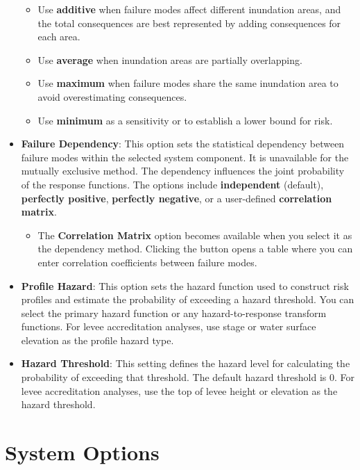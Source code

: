 \documentclass[
]{book}
\providecommand{\tightlist}{%
  \setlength{\itemsep}{0pt}\setlength{\parskip}{0pt}}
\begin{document}
\begin{itemize}
  \begin{itemize}
  \item
    Use \textbf{additive} when failure modes affect different inundation areas, and the total consequences are best represented by adding consequences for each area.
  \item
    Use \textbf{average} when inundation areas are partially overlapping.
  \item
    Use \textbf{maximum} when failure modes share the same inundation area to avoid overestimating consequences.
  \item
    Use \textbf{minimum} as a sensitivity or to establish a lower bound for risk.
  \end{itemize}
\item
  \textbf{Failure Dependency}: This option sets the statistical dependency between failure modes within the selected system component. It is unavailable for the mutually exclusive method. The dependency influences the joint probability of the response functions. The options include \textbf{independent} (default), \textbf{perfectly positive}, \textbf{perfectly negative}, or a user-defined \textbf{correlation matrix}.

  \begin{itemize}
  \tightlist
  \item
    The \textbf{Correlation Matrix} option becomes available when you select it as the dependency method. Clicking the button opens a table where you can enter correlation coefficients between failure modes.
  \end{itemize}
\item
  \textbf{Profile Hazard}: This option sets the hazard function used to construct risk profiles and estimate the probability of exceeding a hazard threshold. You can select the primary hazard function or any hazard-to-response transform functions. For levee accreditation analyses, use stage or water surface elevation as the profile hazard type.
\item
  \textbf{Hazard Threshold}: This setting defines the hazard level for calculating the probability of exceeding that threshold. The default hazard threshold is 0. For levee accreditation analyses, use the top of levee height or elevation as the hazard threshold.
\end{itemize}

\hypertarget{system-options}{%
\section{System Options}\label{system-options}}
\end{document}
